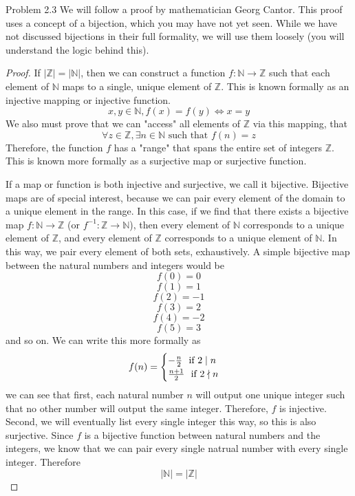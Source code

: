 \begin{sol}{Problem 2.3}
We will follow a proof by mathematician Georg Cantor. This proof uses a concept of a bijection, which you may have not yet seen. While we have not discussed bijections in their full formality, we will use them loosely (you will understand the logic behind this). 
\begin{proof}
If $|\mathbb{Z}| = | \mathbb{N}|$, then we can construct a function $f: \mathbb{N} \to \mathbb{Z}$ such that each element of $\mathbb{N}$ maps to a single, unique element of $\mathbb{Z}$. This is known formally as an injective mapping or injective function. 
\[
x, y \in \mathbb{N}, f(x) = f(y) \iff x = y
\]
We also must prove that we can "access" all elements of $\mathbb{Z}$ via this mapping, that 
\[
\forall z \in \mathbb{Z}, \exists n \in \mathbb{N} \text{ such that } f(n) = z
\]
Therefore, the function $f$ has a "range" that spans the entire set of integers $\mathbb{Z}$. This is known more formally as a surjective map or surjective function. 

If a map or function is both injective and surjective, we call it bijective. Bijective maps are of special interest, because we can pair every element of the domain to a unique element in the range. In this case, if we find that there exists a bijective map $f:\mathbb{N} \to \mathbb{Z}$ (or $f^{-1}: \mathbb{Z} \to \mathbb{N}$), then every element of $\mathbb{N}$ corresponds to a unique element of $\mathbb{Z}$, and every element of $\mathbb{Z}$ corresponds to a unique element of $\mathbb{N}$. In this way, we pair every element of both sets, exhaustively. A simple bijective map between the natural numbers and integers would be
\[
f(0) = 0
\]
\[
 f(1) = 1
\]
\[
f(2) = -1
\]
\[
f(3) = 2
\]
\[
f(4) = -2
\]
\[
f(5) = 3
\]
and so on. We can write this more formally as 
\[
f(n) = 
\begin{cases}
-\frac{n}{2} ~~ \text{if $2 \mid n$}\\
\frac{n+1}{2} ~~ \text{if $ 2 \nmid n$}
\end{cases}
\]
we can see that first, each natural number $n$ will output one unique integer such that no other number will output the same integer. Therefore, $f$ is injective. Second, we will eventually list every single integer this way, so this is also surjective. Since $f$ is a bijective function between natural numbers and the integers, we know that we can pair every single natrual number with every single integer. Therefore
\[
|\mathbb{N}| = |\mathbb{Z}|
\]
\end{proof}


\end{sol}
